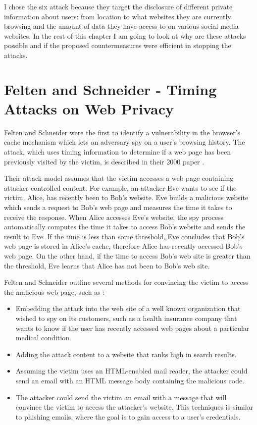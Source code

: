 \documentclass[10pt,a4paper,twoside]{book}
\begin{document}
I chose the six attack because they target the disclosure of different private information about users: from location to what websites they are currently browsing and the amount of data they have access to on various social media websites. In the rest of this chapter I am going to look at why are these attacks possible and if the proposed countermeasures were efficient in stopping the attacks.

\section{Felten and Schneider - Timing Attacks on Web Privacy}
\label{feltenschneider}
Felten and Schneider were the first to identify a vulnerability in the browser's cache mechanism which lets an adversary spy on a user's browsing history. The attack, which uses timing information to determine if a web page has been previously visited by the victim, is described in their 2000 paper \cite{felten2000timing}.

Their attack model assumes that the victim accesses a web page containing attacker-controlled content. For example, an attacker Eve wants to see if the victim, Alice, has recently been to Bob's website. Eve builds a malicious website which sends a request to Bob's web page and measures the time it takes to receive the response. When Alice accesses Eve's website, the spy process automatically computes the time it takes to access Bob's website and sends the result to Eve. If the time is less than some threshold, Eve concludes that Bob's web page is stored in Alice's cache, therefore Alice has recently accessed Bob's web page. On the other hand, if the time to access Bob's web site is greater than the threshold, Eve learns that Alice has not been to Bob's web site.

Felten and Schneider outline several methods for convincing the victim to access the malicious web page, such as \cite{felten2000timing}:
\begin{itemize}
\item Embedding the attack into the web site of a well known organization that wished to spy on its customers, such as a health insurance company that wants to know if the user has recently accessed web pages about a particular medical condition.
\item Adding the attack content to a website that ranks high in search results. 
\item Assuming the victim uses an HTML-enabled mail reader, the attacker could send an email with an HTML message body containing the malicious code.
\item The attacker could send the victim an email with a message that will convince the victim to access the attacker's website. This techniques is similar to phishing emails, where the goal is to gain access to a user's credentials.
\end{itemize}
\end{document}

